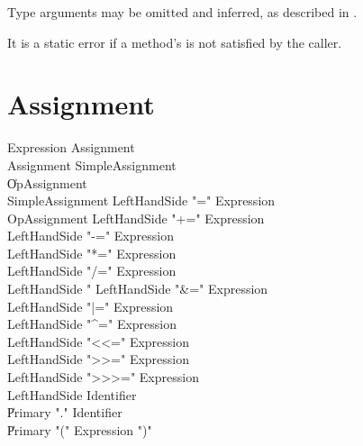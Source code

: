 Type arguments may be omitted and inferred, as described in
.

It is a static error if a method's  is not satisfied by the caller.

\section{Assignment}\label{AssignmentStatement}

\begin{grammar}
Expression \: Assignment \\
Assignment \: SimpleAssignment \\
           \| OpAssignment \\
SimpleAssignment \: LeftHandSide \xcd"=" Expression \\
OpAssignment \: LeftHandSide \xcd"+=" Expression \\
             \: LeftHandSide \xcd"-=" Expression \\
             \: LeftHandSide \xcd"*=" Expression \\
             \: LeftHandSide \xcd"/=" Expression \\
             \: LeftHandSide \xcd"%
             \: LeftHandSide \xcd"&=" Expression \\
             \: LeftHandSide \xcd"|=" Expression \\
             \: LeftHandSide \xcd"^=" Expression \\
             \: LeftHandSide \xcd"<<=" Expression \\
             \: LeftHandSide \xcd">>=" Expression \\
             \: LeftHandSide \xcd">>>=" Expression \\
LeftHandSide \: Identifier \\
             \| Primary \xcd"." Identifier \\
             \| Primary \xcd"(" Expression \xcd")" \\
\end{grammar}

%

